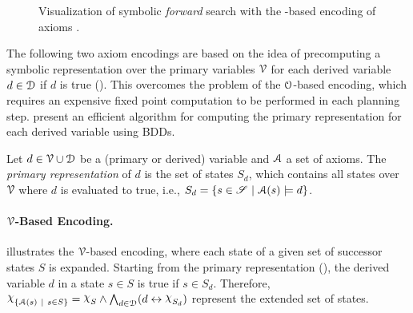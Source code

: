 \begin{figure}
    \centering
    
    \caption[\vars{}-based encoding of axioms.]{Visualization of symbolic \emph{forward} search with the
        \vars{}-based encoding of axioms \autocite{speck-et-al-icaps2019}.\label{fig:axiom_option2}}
\end{figure}

\medskip
The following two axiom encodings are based on the idea of precomputing a symbolic representation over the primary variables $\mathcal V$ for each derived variable $d \in \mathcal D$ if $d$ is true (). 
This overcomes the problem of the $\mathcal O$-based encoding, which requires an expensive fixed point computation to be performed in each planning step. 
\textcite{speck-et-al-icaps2019} present an efficient algorithm for computing the primary representation for each derived variable using BDDs.

\begin{definition}\label{def:primary_representation}
    Let $d \in \mathcal V \cup \mathcal D$ be a (primary or derived) variable and $\mathcal A$ a set of axioms.
    The \emph{primary representation} of $d$ is the set of states $S_d$, which contains all states over $\mathcal V$ where $d$ is evaluated to true, i.e., $S_d = \{ s \in \mathscr S ~|~ \mathcal A(s) \models d \}$.
\end{definition}

\paragraph{$\mathcal V$-Based Encoding.}
 illustrates the $\mathcal V$-based encoding, where each state of a given set of successor states $S$ is expanded.
Starting from the primary representation (), the derived variable $d$ in a state $s \in S$ is true if $s \in S_d$. 
Therefore, $\charf_{\{\axioms{}(s) ~\mid~ s \in S\}} = \charf_{S} \land \bigwedge_{d\in \derivedvars} (d \leftrightarrow \charf_{S_d})$ represent the extended set of states. 


